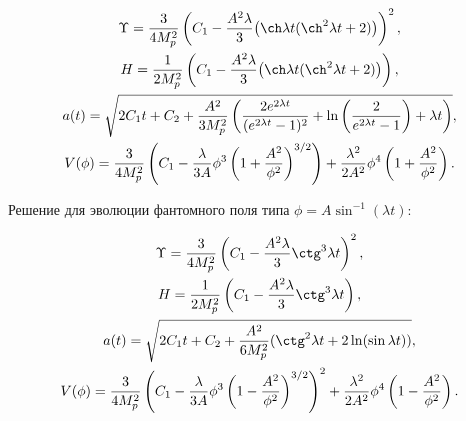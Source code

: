 \begin{gather*}

%

\Upsilon= \frac{3}{4M_p^2}\left(C_1-\frac{A^2\lambda}{3}\bigl(\ch \lambda t(\ch^2 \lambda t +2)\bigr)\right)^2,\\

H=\frac{1}{2M_p^2}\left(C_1-\frac{A^2\lambda}{3}\bigl(\ch \lambda t(\ch^2 \lambda t +2)\bigr)\right),\\

a(t)= \sqrt{2C_1t+C_2+\frac{A^2}{3M_p^2}\left(\frac{2e^{2\lambda t}}{(e^{2\lambda t}-1)^2}

+\ln\left(\frac{2}{e^{2\lambda t}-1}\right)+\lambda t\right)},\\

V(\phi)=\frac{3}{4M_p^2}\left(C_1-\frac{\lambda}{3A}\phi^3\left(1+\frac{A^2}{\phi^2}\right)^{3/2}\right)

+\frac{\lambda^2}{2A^2}\phi^4\left(1+\frac{A^2}{\phi^2}\right).

%

\end{gather*}









Решение для эволюции фантомного поля типа $ \phi=A \sin^{-1} (\lambda t) $:

%

\begin{gather*}

%

\Upsilon= \frac{3}{4M_p^2}\left(C_1-\frac{A^2\lambda}{3}\ctg^3 \lambda t\right)^2,\\

H=\frac{1}{2M_p^2}\left(C_1-\frac{A^2\lambda}{3}\ctg^3 \lambda t\right),\\

a(t)= \sqrt{2C_1t+C_2+\frac{A^2}{6M_p^2}(\ctg^2

\lambda t+2\ln(\sin \lambda t))},\\

V(\phi)=\frac{3}{4M_p^2}\left(C_1-\frac{\lambda}{3A}\phi^3\left(1-\frac{A^2}{\phi^2}\right)^{3/2}\right)^2

+\frac{\lambda^2}{2A^2}\phi^4\left(1-\frac{A^2}{\phi^2}\right).

%

\end{gather*}



